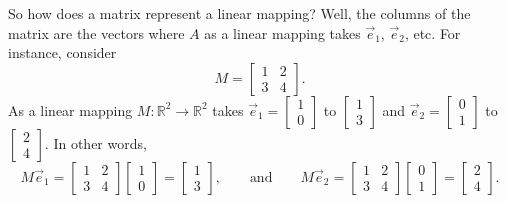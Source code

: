 So how does a matrix represent a linear mapping?
Well, the columns of the matrix are the vectors where $A$ as a linear
mapping takes $\vec{e}_1$, $\vec{e}_2$, etc.
For instance, consider
\begin{equation*}
M = 
\begin{bmatrix}
1 & 2 \\ 3 & 4
\end{bmatrix} .
\end{equation*}
As a linear mapping $M \colon {\mathbb R}^2 \to {\mathbb R}^2$ takes
$\vec{e}_1 = \left[ \begin{smallmatrix} 1 \\ 0 \end{smallmatrix} \right]$ to
$\left[ \begin{smallmatrix} 1 \\ 3 \end{smallmatrix} \right]$
and
$\vec{e}_2 = \left[ \begin{smallmatrix} 0 \\ 1 \end{smallmatrix} \right]$ to
$\left[ \begin{smallmatrix} 2 \\ 4 \end{smallmatrix} \right]$.  In other
words,
\begin{equation*}
M \vec{e}_1 =
\begin{bmatrix}
1 & 2 \\ 3 & 4
\end{bmatrix}
\begin{bmatrix}
1 \\ 0
\end{bmatrix}
=
\begin{bmatrix}
1 \\ 3
\end{bmatrix},
\qquad
\text{and}
\qquad
M \vec{e}_2 =
\begin{bmatrix}
1 & 2 \\ 3 & 4
\end{bmatrix}
\begin{bmatrix}
0 \\ 1
\end{bmatrix}
=
\begin{bmatrix}
2 \\ 4
\end{bmatrix}.
\end{equation*}

